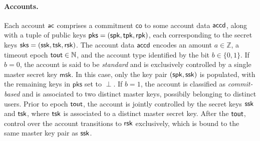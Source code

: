 \paragraph*{Accounts.}
Each account $\mathsf{ac}$ comprises a commitment $\mathsf{co}$ to some account data $\mathsf{accd}$, along with a tuple of public keys $\mathsf{pks} = ( \mathsf{spk}, \mathsf{tpk}, \mathsf{rpk} )$, each corresponding to the secret keys  $\mathsf{sks} = ( \mathsf{ssk}, \mathsf{tsk}, \mathsf{rsk} )$. The account data $\mathsf{accd}$ encodes an amount $a \in \mathbb{Z}$, a timeout epoch $\mathsf{tout} \in \mathbb{N}$, and the account type identified by the bit $b \in \{ 0, 1 \}$. If $b = 0$, the account is said to be \textit{standard} and is exclusively controlled by a single master secret key $\mathsf{msk}$. In this case, only the key pair $(\mathsf{spk}, \mathsf{ssk})$ is populated, with the remaining keys in $\mathsf{pks}$ set to $\perp$. If $b = 1$, the account is classified as \textit{commit-based} and is associated to two distinct master keys, possibily belonging to distinct users. Prior to epoch $\mathsf{tout}$, the account is jointly controlled by the secret keys $\mathsf{ssk}$ and $\mathsf{tsk}$, where $\mathsf{tsk}$ is associated to a distinct master secret key. After the $\mathsf{tout}$, control over the account transitions to  $\mathsf{rsk}$ exclusively, which is bound to the same master key pair as $\mathsf{ssk}$.

